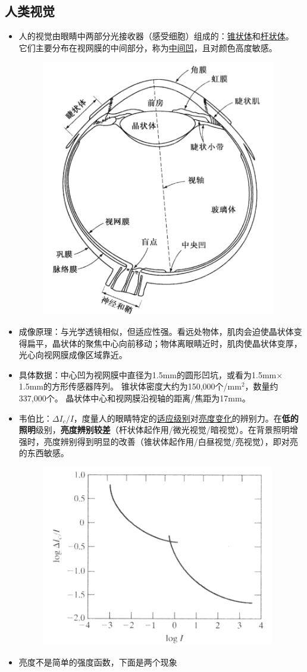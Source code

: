 \subsection{人类视觉}
\begin{itemize}
\item 人的视觉由眼睛中两部分光接收器（感受细胞）组成的：\underline{锥状体}和\underline{杆状体}。
它们主要分布在视网膜的中间部分，称为\underline{中间凹}，且对颜色高度敏感。
\begin{figure}[H]
\centering
\includegraphics[width=0.4\linewidth]{fig/eye.png}
\end{figure}
\item 成像原理：与光学透镜相似，但适应性强。看远处物体，肌肉会迫使晶状体变得扁平，晶状体的聚焦中心向前移动；物体离眼睛近时，肌肉使晶状体变厚，光心向视网膜成像区域靠近。
\item 具体数据：中心凹为视网膜中直径为1.5mm的圆形凹坑，或看为1.5mm$\times$ 1.5mm的方形传感器阵列。
锥状体密度大约为150,000个/mm$^2$，数量约337,000个。
晶状体中心和视网膜沿视轴的距离/焦距为17mm。
\item 韦伯比：$\Delta I_c/I$，度量人的眼睛特定的\underline{适应级别}对\underline{亮度变化}的辨别力。在\textbf{低的照明}级别，\textbf{亮度辨别较差}（杆状体起作用/微光视觉/暗视觉）。在背景照明增强时，亮度辨别得到明显的改善（锥状体起作用/白昼视觉/亮视觉），即对亮的东西敏感。
\begin{figure}[H]
	\centering
	\includegraphics[width=0.4\linewidth]{fig/webb.png}
\end{figure}
\item 亮度不是简单的强度函数，下面是两个现象

\end{itemize}
